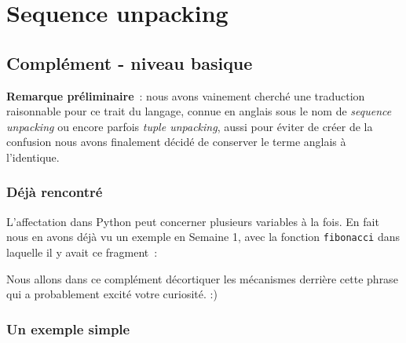     
    
    
    

    

    \hypertarget{sequence-unpacking}{%
\section{Sequence unpacking}\label{sequence-unpacking}}

    \hypertarget{compluxe9ment---niveau-basique}{%
\subsection{Complément - niveau
basique}\label{compluxe9ment---niveau-basique}}

    \textbf{Remarque préliminaire}~: nous avons vainement cherché une
traduction raisonnable pour ce trait du langage, connue en anglais sous
le nom de \emph{sequence unpacking} ou encore parfois \emph{tuple
unpacking}, aussi pour éviter de créer de la confusion nous avons
finalement décidé de conserver le terme anglais à l'identique.

    \hypertarget{duxe9juxe0-rencontruxe9}{%
\subsubsection{Déjà rencontré}\label{duxe9juxe0-rencontruxe9}}

    L'affectation dans Python peut concerner plusieurs variables à la fois.
En fait nous en avons déjà vu un exemple en Semaine 1, avec la fonction
\texttt{fibonacci} dans laquelle il y avait ce fragment~:

\begin{Shaded}
\begin{Highlighting}[]
 \NormalTok{(}\OperatorTok{+} \NormalTok{):}
\OperatorTok{=}\OperatorTok{+}
\end{Highlighting}
\end{Shaded}

Nous allons dans ce complément décortiquer les mécanismes derrière cette
phrase qui a probablement excité votre curiosité. :)

    \hypertarget{un-exemple-simple}{%
\subsubsection{Un exemple simple}\label{un-exemple-simple}}

